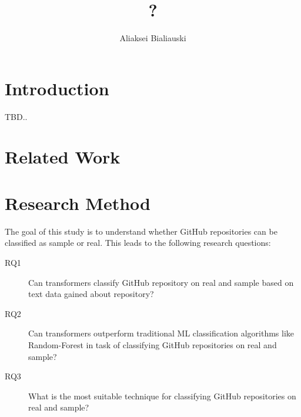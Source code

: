 \documentclass[sigplan,nonacm,review]{acmart}
\title{?}
\author{Aliaksei Bialiauski}
\affiliation{
    \institution{?}
    \city{Minsk}
    \country{Belarus}
}
\begin{document}
\maketitle


\section{Introduction}\label{sec:introduction}
TBD.. \citet{testCitation}


\section{Related Work}\label{sec:related}


\section{Research Method}\label{sec:method}
The goal of this study is to understand whether GitHub repositories can be
classified as sample or real. This leads to the following research questions:
\begin{description}
    \item[RQ1] Can transformers classify GitHub repository on real and
    sample based on text data gained about repository?
    \item[RQ2] Can transformers outperform traditional ML classification
    algorithms like Random-Forest in task of classifying GitHub repositories on
    real and sample?
    \item[RQ3] What is the most suitable technique for classifying GitHub
    repositories on real and sample?
\end{description}
\end{document}
